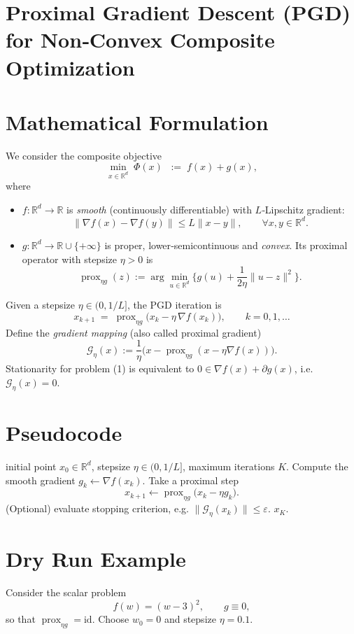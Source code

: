 \documentclass{article}
\newcommand{\prox}{\operatorname{prox}}
\newcommand{\R}{\mathbb{R}}
\newcommand{\grad}{\nabla}
\newcommand{\G}{\mathcal{G}}
\begin{document}
\section*{Proximal Gradient Descent (PGD) for Non‑Convex Composite Optimization}

\section*{Mathematical Formulation}
We consider the composite objective
\[
\min_{x\in\R^{d}} \; \Phi(x)\;\;:=\; f(x)+g(x),
\tag{1}
\]
where  

\begin{itemize}
\item $f:\R^{d}\to\R$ is \emph{smooth} (continuously differentiable) with $L$‑Lipschitz gradient:
\[
\|\grad f(x)-\grad f(y)\|\le L\|x-y\|,\qquad\forall x,y\in\R^{d}.
\tag{A1}
\]
\item $g:\R^{d}\to\R\cup\{+\infty\}$ is proper, lower‑semicontinuous and \emph{convex}.  
Its proximal operator with stepsize $\eta>0$ is
\[
\prox_{\eta g}(z):=\arg\min_{u\in\R^{d}}\Big\{g(u)+\frac{1}{2\eta}\|u-z\|^{2}\Big\}.
\tag{A2}
\]
\end{itemize}
Given a stepsize $\eta\in(0,1/L]$, the PGD iteration is
\[
x_{k+1}\;=\;\prox_{\eta g}\!\Big(x_{k}-\eta\,\grad f(x_{k})\Big),\qquad k=0,1,\dots
\tag{2}
\]
Define the \emph{gradient mapping} (also called proximal gradient) 
\[
\G_{\eta}(x):=\frac{1}{\eta}\Big(x-\prox_{\eta g}(x-\eta\grad f(x))\Big).
\tag{3}
\]
Stationarity for problem (1) is equivalent to $0\in\grad f(x)+\partial g(x)$,
i.e. $\G_{\eta}(x)=0$.

\section*{Pseudocode}
\begin{algorithm}[H]
\caption{Proximal Gradient Descent (PGD)}
\begin{algorithmic}[1]
\REQUIRE initial point $x_{0}\in\R^{d}$, stepsize $\eta\in(0,1/L]$, maximum iterations $K$.
    \STATE Compute the smooth gradient $g_{k}\gets\grad f(x_{k})$.
    \STATE Take a proximal step
    \[
    x_{k+1}\gets\prox_{\eta g}\bigl(x_{k}-\eta g_{k}\bigr).
    \]
    \STATE (Optional) evaluate stopping criterion, e.g.
    $\|\G_{\eta}(x_{k})\|\le\varepsilon$.
\ENDFOR
\RETURN $x_{K}$.
\end{algorithmic}
\end{algorithm}

\section*{Dry Run Example}
Consider the scalar problem 
\[
f(w)=(w-3)^{2},\qquad g\equiv0,
\]
so that $\prox_{\eta g}= \mathrm{id}$.
Choose $w_{0}=0$ and stepsize $\eta=0.1$.
\end{document}
